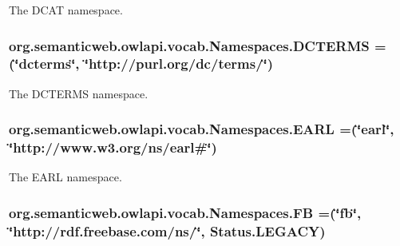 The D\-C\-A\-T namespace. \hypertarget{enumorg_1_1semanticweb_1_1owlapi_1_1vocab_1_1_namespaces_a11be8c707d13bd9af9180af8a67a42df}{
\subsubsection[{D\-C\-T\-E\-R\-M\-S}]{\setlength{\rightskip}{0pt plus 5cm}org.\-semanticweb.\-owlapi.\-vocab.\-Namespaces.\-D\-C\-T\-E\-R\-M\-S =(\char`\"{}dcterms\char`\"{}, \char`\"{}http\-://purl.\-org/dc/terms/\char`\"{})}}\label{enumorg_1_1semanticweb_1_1owlapi_1_1vocab_1_1_namespaces_a11be8c707d13bd9af9180af8a67a42df}
The D\-C\-T\-E\-R\-M\-S namespace. \hypertarget{enumorg_1_1semanticweb_1_1owlapi_1_1vocab_1_1_namespaces_a12fb1a59481c30e735ac6546dab61d78}{
\subsubsection[{E\-A\-R\-L}]{\setlength{\rightskip}{0pt plus 5cm}org.\-semanticweb.\-owlapi.\-vocab.\-Namespaces.\-E\-A\-R\-L =(\char`\"{}earl\char`\"{}, \char`\"{}http\-://www.\-w3.\-org/{\bf ns}/earl\#\char`\"{})}}\label{enumorg_1_1semanticweb_1_1owlapi_1_1vocab_1_1_namespaces_a12fb1a59481c30e735ac6546dab61d78}
The E\-A\-R\-L namespace. \hypertarget{enumorg_1_1semanticweb_1_1owlapi_1_1vocab_1_1_namespaces_ad7cabf9dea17c9517f3fb363112d4ff3}{
\subsubsection[{F\-B}]{\setlength{\rightskip}{0pt plus 5cm}org.\-semanticweb.\-owlapi.\-vocab.\-Namespaces.\-F\-B =(\char`\"{}fb\char`\"{}, \char`\"{}http\-://rdf.\-freebase.\-com/{\bf ns}/\char`\"{}, Status.\-L\-E\-G\-A\-C\-Y)}}\label{enumorg_1_1semanticweb_1_1owlapi_1_1vocab_1_1_namespaces_ad7cabf9dea17c9517f3fb363112d4ff3}
